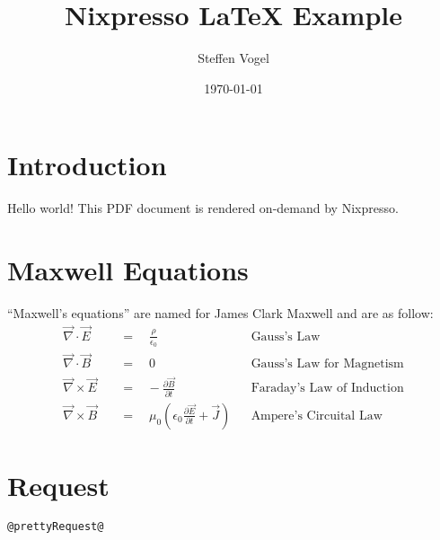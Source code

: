 \documentclass{article}
\title{Nixpresso \LaTeX{} Example}
\author{Steffen Vogel}
\date{\today}
\begin{document}
\maketitle
\section{Introduction}
Hello world! This PDF document is rendered on-demand by Nixpresso.

\section{Maxwell Equations}
``Maxwell's equations'' are named for James Clark Maxwell and are as follow:
\begin{align}             
\vec{\nabla} \cdot \vec{E} \quad &=\quad\frac{\rho}{\epsilon_0} &&\text{Gauss's Law} \\      
\vec{\nabla} \cdot \vec{B} \quad &=\quad 0 &&\text{Gauss's Law for Magnetism}\\
\vec{\nabla} \times \vec{E} \quad &=\hspace{10pt}-\frac{\partial{\vec{B}}}{\partial{t}} &&\text{Faraday's Law of Induction} \\ 
\vec{\nabla} \times \vec{B} \quad &=\quad \mu_0\left( \epsilon_0\frac{\partial{\vec{E}}}{\partial{t}}+\vec{J}\right) &&\text{Ampere's Circuital Law}
\end{align}

\section{Request}

\begin{lstlisting}[language=Nix]
@prettyRequest@
\end{lstlisting}
\end{document}
